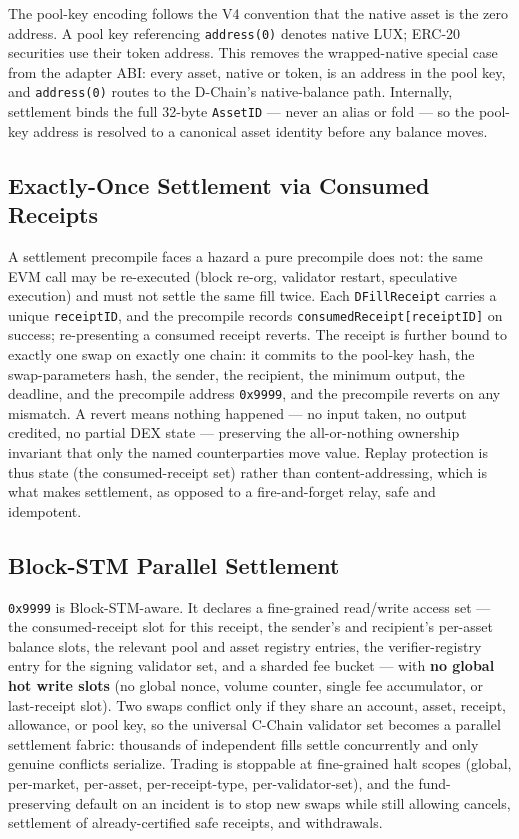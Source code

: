 The pool-key encoding follows the V4 convention that the native asset is
the zero address. A pool key referencing \texttt{address(0)} denotes
native LUX; ERC-20 securities use their token address. This removes the
wrapped-native special case from the adapter ABI: every asset, native or
token, is an address in the pool key, and \texttt{address(0)} routes to
the D-Chain's native-balance path. Internally, settlement binds the full
32-byte \texttt{AssetID} --- never an alias or fold --- so the pool-key
address is resolved to a canonical asset identity before any balance moves.

\subsection{Exactly-Once Settlement via Consumed Receipts}

A settlement precompile faces a hazard a pure precompile does not: the
same EVM call may be re-executed (block re-org, validator restart,
speculative execution) and must not settle the same fill twice. Each
\texttt{DFillReceipt} carries a unique \texttt{receiptID}, and the
precompile records \texttt{consumedReceipt[receiptID]} on success;
re-presenting a consumed receipt reverts. The receipt is further bound to
exactly one swap on exactly one chain: it commits to the pool-key hash,
the swap-parameters hash, the sender, the recipient, the minimum output,
the deadline, and the precompile address \texttt{0x9999}, and the
precompile reverts on any mismatch. A revert means nothing happened --- no
input taken, no output credited, no partial DEX state --- preserving the
all-or-nothing ownership invariant that only the named counterparties move
value. Replay protection is thus state (the consumed-receipt set) rather
than content-addressing, which is what makes settlement, as opposed to a
fire-and-forget relay, safe and idempotent.

\subsection{Block-STM Parallel Settlement}

\texttt{0x9999} is Block-STM-aware. It declares a fine-grained read/write
access set --- the consumed-receipt slot for this receipt, the sender's and
recipient's per-asset balance slots, the relevant pool and asset registry
entries, the verifier-registry entry for the signing validator set, and a
sharded fee bucket --- with \textbf{no global hot write slots} (no global
nonce, volume counter, single fee accumulator, or last-receipt slot). Two
swaps conflict only if they share an account, asset, receipt, allowance, or
pool key, so the universal C-Chain validator set becomes a parallel
settlement fabric: thousands of independent fills settle concurrently and
only genuine conflicts serialize. Trading is stoppable at fine-grained halt
scopes (global, per-market, per-asset, per-receipt-type, per-validator-set),
and the fund-preserving default on an incident is to stop new swaps while
still allowing cancels, settlement of already-certified safe receipts, and
withdrawals.

